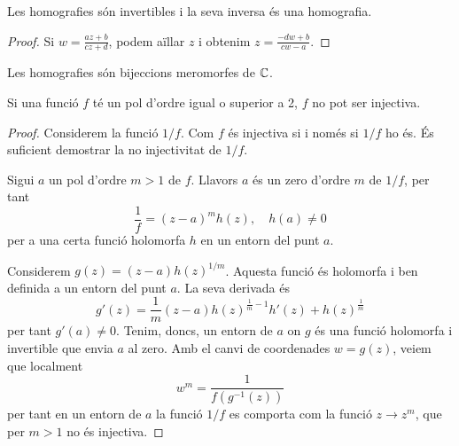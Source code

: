\documentclass[dvipsnames, svgnames, leqno, a4paper, 12pt]{article}
\begin{document}
        \begin{proposition}
            Les homografies són invertibles i la seva inversa és una homografia.
        \end{proposition}
        
        \begin{proof}
            Si \begin{math}
                 w  = \frac{az+b}{cz+d} 
            \end{math}, podem aïllar $z$ i obtenim \begin{math}
                z = \frac{-d  w +b}{c w -a}
            \end{math}.
        \end{proof}

        \begin{corollary}
            Les homografies són bijeccions meromorfes de $\mathbb{C}$.
        \end{corollary}

        \begin{lemma}
            Si una funció $f$ té un pol d'ordre igual o superior a 2, $f$ no pot ser injectiva.  
        \end{lemma}

        \begin{proof}
            Considerem la funció $1/f$. Com $f$ és injectiva si i només si $1/f$ ho és. És suficient demostrar la no injectivitat de $1/f$.
            
            Sigui $a$ un pol d'ordre $m>1$ de $f$. Llavors $a$ és un zero d'ordre $m$ de $1/f$, per tant 
            \begin{displaymath}
                \frac{1}{f}=(z-a)^mh(z),\quad  h(a)\neq0
            \end{displaymath} 
            per a una certa funció holomorfa $h$ en un entorn del punt $a$.

            Considerem $ g(z)=(z-a)h(z)^{1/m}$. Aquesta funció és holomorfa i ben definida a un entorn del punt $a$. La seva derivada és 
            \begin{displaymath}
                g'(z)=\frac{1}{m}(z-a)h(z)^{\frac{1}{m}-1}h'(z)+h(z)^{\frac{1}{m}}
            \end{displaymath} 
            per tant $g'(a)\neq0$.
            Tenim, doncs, un entorn de $a$ on $g$ és una funció holomorfa i invertible que envia $a$ al zero. Amb el canvi de coordenades $ w  = g(z)$, veiem que localment 
            \begin{displaymath}
                 w ^m = \frac{1}{f(g^{-1}(z))}
            \end{displaymath} 
            per tant en un entorn de $a$ la funció $1/f$ es comporta com la funció $z\to z^m$, que per $m>1$ no és injectiva.
        \end{proof}
\end{document}
